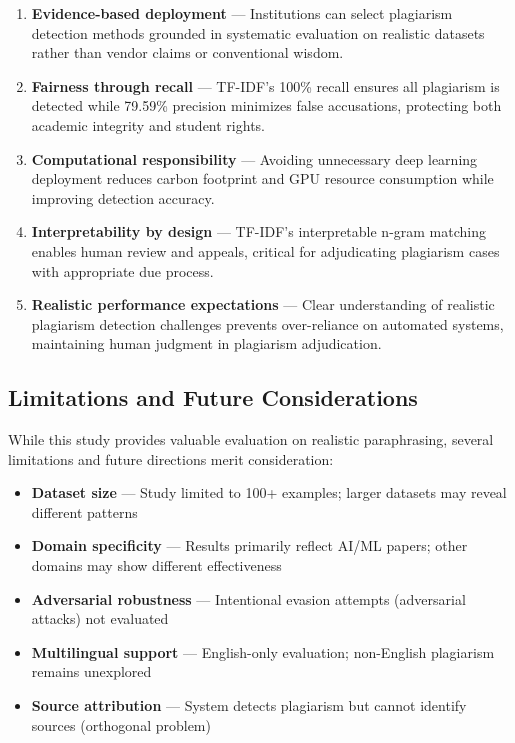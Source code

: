 \begin{enumerate}
  \item \textbf{Evidence-based deployment} --- Institutions can select plagiarism detection methods grounded in systematic evaluation on realistic datasets rather than vendor claims or conventional wisdom.
  
  \item \textbf{Fairness through recall} --- TF-IDF's 100\% recall ensures all plagiarism is detected while 79.59\% precision minimizes false accusations, protecting both academic integrity and student rights.
  
  \item \textbf{Computational responsibility} --- Avoiding unnecessary deep learning deployment reduces carbon footprint and GPU resource consumption while improving detection accuracy.
  
  \item \textbf{Interpretability by design} --- TF-IDF's interpretable n-gram matching enables human review and appeals, critical for adjudicating plagiarism cases with appropriate due process.
  
  \item \textbf{Realistic performance expectations} --- Clear understanding of realistic plagiarism detection challenges prevents over-reliance on automated systems, maintaining human judgment in plagiarism adjudication.
\end{enumerate}

\subsection{Limitations and Future Considerations}

While this study provides valuable evaluation on realistic paraphrasing, several limitations and future directions merit consideration:

\begin{itemize}
  \item \textbf{Dataset size} --- Study limited to 100+ examples; larger datasets may reveal different patterns
  \item \textbf{Domain specificity} --- Results primarily reflect AI/ML papers; other domains may show different effectiveness
  \item \textbf{Adversarial robustness} --- Intentional evasion attempts (adversarial attacks) not evaluated
  \item \textbf{Multilingual support} --- English-only evaluation; non-English plagiarism remains unexplored
  \item \textbf{Source attribution} --- System detects plagiarism but cannot identify sources (orthogonal problem)
\end{itemize}

